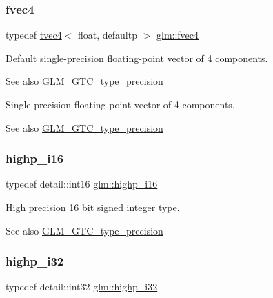 \subsubsection{\texorpdfstring{fvec4}{fvec4}}
{\footnotesize\ttfamily typedef \hyperlink{structglm_1_1tvec4}{tvec4}$<$ float, defaultp $>$ \hyperlink{group__gtc__type__precision_ga396c4084cd7e5465f8b56035e0420c3e}{glm\+::fvec4}}

Default single-\/precision floating-\/point vector of 4 components. \begin{DoxySeeAlso}{See also}
\hyperlink{group__gtc__type__precision}{G\+L\+M\+\_\+\+G\+T\+C\+\_\+type\+\_\+precision}
\end{DoxySeeAlso}
Single-\/precision floating-\/point vector of 4 components. \begin{DoxySeeAlso}{See also}
\hyperlink{group__gtc__type__precision}{G\+L\+M\+\_\+\+G\+T\+C\+\_\+type\+\_\+precision} 
\end{DoxySeeAlso}
\mbox{\label{group__gtc__type__precision_gaa04399853952dbce29cb62e2432f350a}} 
\subsubsection{\texorpdfstring{highp\+\_\+i16}{highp\_i16}}
{\footnotesize\ttfamily typedef detail\+::int16 \hyperlink{group__gtc__type__precision_gaa04399853952dbce29cb62e2432f350a}{glm\+::highp\+\_\+i16}}

High precision 16 bit signed integer type. \begin{DoxySeeAlso}{See also}
\hyperlink{group__gtc__type__precision}{G\+L\+M\+\_\+\+G\+T\+C\+\_\+type\+\_\+precision} 
\end{DoxySeeAlso}
\mbox{\label{group__gtc__type__precision_ga197d19b585222da57d70238a5cfc2be8}} 
\subsubsection{\texorpdfstring{highp\+\_\+i32}{highp\_i32}}
{\footnotesize\ttfamily typedef detail\+::int32 \hyperlink{group__gtc__type__precision_ga197d19b585222da57d70238a5cfc2be8}{glm\+::highp\+\_\+i32}}

